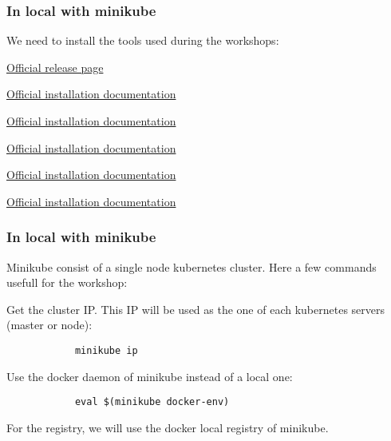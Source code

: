 \begin{frame}
	\frametitle{In local with minikube}
	
	We need to install the tools used during the workshops:
	\begin{description}[leftmargin=!,labelwidth=\widthof{\bfseries Kustomize}]
		\item[Docker] \href{https://hub.docker.com/search/?type=edition&offering=community}{Official release page}
		\item[Kubectl] \href{https://kubernetes.io/docs/tasks/tools/install-kubectl/}{Official installation documentation}
		\item[Minikube] \href{https://kubernetes.io/docs/tasks/tools/install-minikube/}{Official installation documentation}
		\item[Kustomize] \href{https://github.com/kubernetes-sigs/kustomize/blob/master/docs/INSTALL.md}{Official installation documentation}
		\item[Skaffold] \href{https://skaffold.dev/docs/getting-started/\#installing-skaffold}{Official installation documentation}
		\item[Stern] \href{https://github.com/wercker/stern}{Official installation documentation}
	\end{description}	
\end{frame}

\begin{frame}[fragile]
	\frametitle{In local with minikube}
	
	Minikube consist of a single node kubernetes cluster. Here a few commands usefull for the workshop:
	
	\begin{block}{Get the cluster IP. This IP will be used as the one of each kubernetes servers (master or node):}
		\begin{verbatim}
			minikube ip
		\end{verbatim}
	\end{block}
	
	\medskip	
	
	\begin{block}{Use the docker daemon of minikube instead of a local one:}
		\begin{verbatim}
			eval $(minikube docker-env)
		\end{verbatim}
	\end{block}
	
	\medskip
	For the registry, we will use the docker local registry of minikube.
\end{frame}